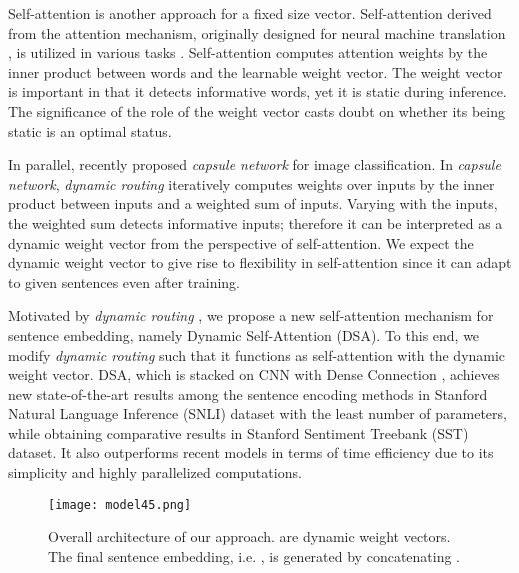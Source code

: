 \documentclass[11pt,a4paper]{article}
\begin{document}
Self-attention is another approach for a fixed size vector. Self-attention derived from the attention mechanism, originally designed for neural machine translation \cite{seqtoseqattention}, is utilized in various tasks \cite{Yang,hierarchical,varioustasks}. Self-attention computes attention weights by the inner product between words and the learnable weight vector. The weight vector is important in that it detects informative words, yet it is static during inference. The significance of the role of the weight vector casts doubt on whether its being static is an optimal status.




In parallel, \citet{capsule} recently proposed \textit{capsule network} for image classification. In \textit{capsule network}, \textit{dynamic routing} iteratively computes weights over inputs by the inner product between inputs and a weighted sum of inputs. Varying with the inputs, the weighted sum detects informative inputs; therefore it can be interpreted as a dynamic weight vector from the perspective of self-attention. We expect the dynamic weight vector to give rise to flexibility in self-attention since it can adapt to given sentences even after training.






Motivated by \textit{dynamic routing} \cite{capsule}, we propose a new self-attention mechanism for sentence embedding, namely Dynamic Self-Attention (DSA). To this end, we modify \textit{dynamic routing} such that it functions as self-attention with the dynamic weight vector. DSA, which is stacked on CNN with Dense Connection \cite{dense}, achieves new state-of-the-art results among the sentence encoding methods in Stanford Natural Language Inference (SNLI) dataset with the least number of parameters, while obtaining comparative results in Stanford Sentiment Treebank (SST) dataset. It also outperforms recent models in terms of time efficiency due to its simplicity and highly parallelized computations. 

















\begin{figure*}
        \centering
        \texttt{[image: model45.png]}
        \caption{Overall architecture of our approach.  are dynamic weight vectors. The final sentence embedding, i.e. , is generated by concatenating .}\label{fig:model}
\end{figure*}
\end{document}
